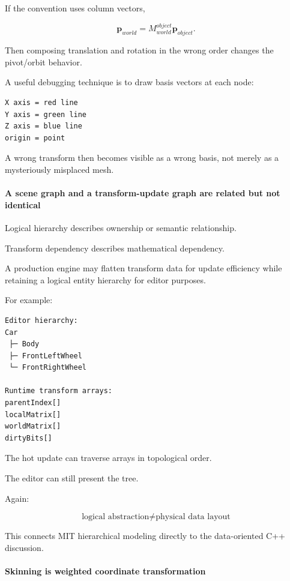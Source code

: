 If the convention uses column vectors,

\[
\mathbf p_{world}
=
M_{world}^{object}
\mathbf p_{object}.
\]

Then composing translation and rotation in the wrong order changes the pivot/orbit behavior.

A useful debugging technique is to draw basis vectors at each node:

\begin{verbatim}
X axis = red line
Y axis = green line
Z axis = blue line
origin = point
\end{verbatim}

A wrong transform then becomes visible as a wrong basis, not merely as a mysteriously misplaced mesh.

\paragraph{A scene graph and a transform-update graph are related but not identical}\label{03-visual-computing-i-ch001-a-scene-graph-and-a-transform-update-graph-are-related-but-not-identical}

\hypertarget{03-visual-computing-i-ch001-a-scene-graph-and-a-transform-update-graph-are-related-but-not-identical}{}

Logical hierarchy describes ownership or semantic relationship.

Transform dependency describes mathematical dependency.

A production engine may flatten transform data for update efficiency while retaining a logical entity hierarchy for editor purposes.

For example:

\begin{verbatim}
Editor hierarchy:
Car
 ├─ Body
 ├─ FrontLeftWheel
 └─ FrontRightWheel

Runtime transform arrays:
parentIndex[]
localMatrix[]
worldMatrix[]
dirtyBits[]
\end{verbatim}

The hot update can traverse arrays in topological order.

The editor can still present the tree.

Again:

\[
\boxed{
\text{logical abstraction}
\neq
\text{physical data layout}
}
\]

This connects MIT hierarchical modeling directly to the data-oriented C++ discussion.

\paragraph{Skinning is weighted coordinate transformation}\label{03-visual-computing-i-ch001-skinning-is-weighted-coordinate-transformation}

